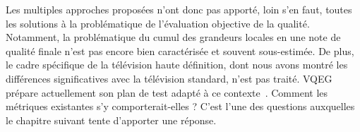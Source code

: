 Les multiples approches proposées n'ont donc pas apporté, loin s'en faut, toutes les solutions à la problématique de l'évaluation objective de la qualité. Notamment, la problématique du cumul des grandeurs locales en une note de qualité finale n'est pas encore bien caractérisée et souvent sous-estimée. De plus, le cadre spécifique de la télévision haute définition, dont nous avons montré les différences significatives avec la télévision standard, n'est pas traité. VQEG prépare actuellement son plan de test adapté à ce contexte~\cite{vqeg-hdtvtestplan}. Comment les métriques existantes s'y comporterait-elles ? C'est l'une des questions auxquelles le chapitre suivant tente d'apporter une réponse.


\ornementChapitre
